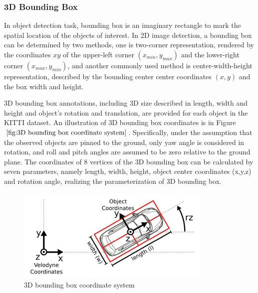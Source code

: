 \subsubsection{3D Bounding Box}
In object detection task, bounding box is an imaginary rectangle to mark the spatial location of the objects of interest. In 2D image detection, a bounding box can be determined by two methods, one is two-corner representation, rendered by the coordinates \(xy\) of the upper-left corner \((x_{min},y_{max})\) and the lower-right corner \((x_{max},y_{min})\), and another commonly used method is center-width-height representation, described by the bounding center center coordinates \((x,y)\) and the box width and height. 

3D bounding box annotations, including 3D size described in length, width and height and object’s rotation and translation, are provided for each object in the KITTI dataset\cite{geiger_vision_2013}. An illustration of 3D bounding box coordinates is in Figure \(\ref{fig:3D bounding box coordinate system}\). Specifically, under the assumption that the observed objects are pinned to the ground, only yaw angle is considered in rotation, and roll and pitch angles are assumed to be zero relative to the ground plane. The coordinates of 8 vertices of the 3D bounding box can be calculated by seven parameters, namely length, width, height, object center coordinates (x,y,z) and rotation angle, realizing the parameterization of 3D bounding box. 

\begin{figure}[!htbp]
\centering
\includegraphics[scale=1]{Graphics/3D bounding box coordinate system.png}
\caption{3D bounding box coordinate system}
\label{fig:3D bounding box coordinate system}
\end{figure}

